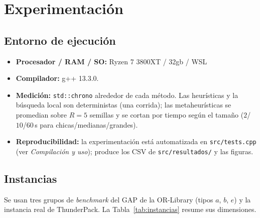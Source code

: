 \documentclass[11pt,a4paper]{article}
\newcommand{\code}[1]{\texttt{#1}}
\begin{document}
\section{Experimentación}\label{sec:exp}
\subsection{Entorno de ejecución}
\begin{itemize}
  \item \textbf{Procesador / RAM / SO:} Ryzen 7 3800XT / 32gb / WSL
  \item \textbf{Compilador:} g++ 13.3.0.
  \item \textbf{Medición:} \code{std::chrono} alrededor de cada método. Las heurísticas y la
        búsqueda local son deterministas (una corrida); las metaheurísticas se promedian sobre
        $R=5$ semillas y se cortan por tiempo según el tamaño ($2$/$10$/$60$\,s para
        chicas/medianas/grandes).
  \item \textbf{Reproducibilidad:} la experimentación está automatizada en \code{src/tests.cpp}
        (ver \emph{Compilación y uso}); produce los CSV de \code{src/resultados/} y las figuras.
\end{itemize}

\subsection{Instancias}
Se usan tres grupos de \emph{benchmark} del GAP de la OR-Library (tipos $a$, $b$, $e$) y la
instancia real de ThunderPack. La Tabla~\ref{tab:instancias} resume sus dimensiones.
\end{document}
